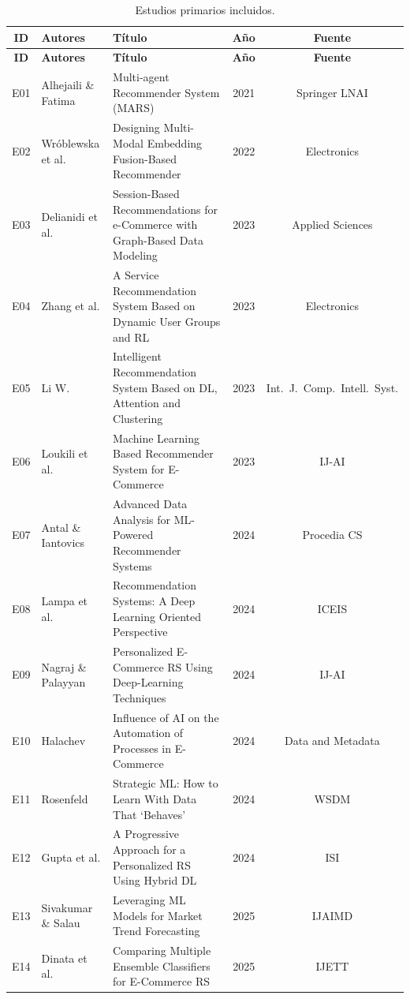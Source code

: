 \documentclass[12pt, a4paper]{article}
\begin{document}
\begin{longtable}{clp{5.8cm}cc}
\caption{Estudios primarios incluidos.\label{tab:ap_estudios}}\\
\toprule
\textbf{ID} & \textbf{Autores} & \textbf{T\'itulo} &
\textbf{A\~no} & \textbf{Fuente} \\
\midrule
\endfirsthead
\toprule
\textbf{ID} & \textbf{Autores} & \textbf{T\'itulo} &
\textbf{A\~no} & \textbf{Fuente} \\
\midrule
\endhead
\bottomrule
\endlastfoot
E01 & Alhejaili \& Fatima &
      Multi-agent Recommender System (MARS) & 2021 & Springer LNAI \\
E02 & Wr{\'o}blewska et al. &
      Designing Multi-Modal Embedding Fusion-Based Recommender & 2022 & Electronics \\
E03 & Delianidi et al. &
      Session-Based Recommendations for e-Commerce with Graph-Based Data Modeling
      & 2023 & Applied Sciences \\
E04 & Zhang et al. &
      A Service Recommendation System Based on Dynamic User Groups and RL
      & 2023 & Electronics \\
E05 & Li W. &
      Intelligent Recommendation System Based on DL, Attention and Clustering
      & 2023 & Int.\ J.\ Comp.\ Intell.\ Syst. \\
E06 & Loukili et al. &
      Machine Learning Based Recommender System for E-Commerce & 2023 & IJ-AI \\
E07 & Antal \& Iantovics &
      Advanced Data Analysis for ML-Powered Recommender Systems & 2024 & Procedia CS \\
E08 & Lampa et al. &
      Recommendation Systems: A Deep Learning Oriented Perspective & 2024 & ICEIS \\
E09 & Nagraj \& Palayyan &
      Personalized E-Commerce RS Using Deep-Learning Techniques & 2024 & IJ-AI \\
E10 & Halachev &
      Influence of AI on the Automation of Processes in E-Commerce
      & 2024 & Data and Metadata \\
E11 & Rosenfeld &
      Strategic ML: How to Learn With Data That `Behaves' & 2024 & WSDM \\
E12 & Gupta et al. &
      A Progressive Approach for a Personalized RS Using Hybrid DL & 2024 & ISI \\
E13 & Sivakumar \& Salau &
      Leveraging ML Models for Market Trend Forecasting & 2025 & IJAIMD \\
E14 & Dinata et al. &
      Comparing Multiple Ensemble Classifiers for E-Commerce RS & 2025 & IJETT \\

\end{longtable}
\end{document}
